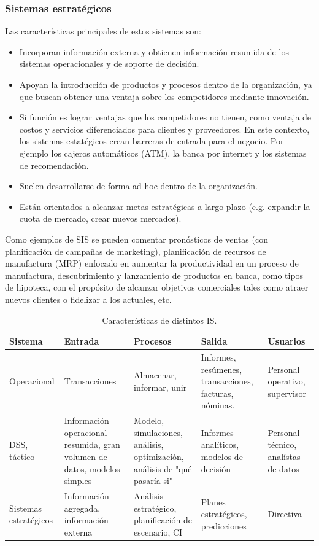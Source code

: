 \subsubsection{Sistemas estratégicos}

Las características principales de estos sistemas son:
\begin{itemize}
\item Incorporan información externa y obtienen información resumida de los sistemas operacionales y de soporte de decisión.
\item Apoyan la introducción de productos y procesos dentro de la organización, ya que buscan obtener una ventaja sobre los competidores mediante innovación.
\item Si función es lograr ventajas que los competidores no tienen, como ventaja de costos y servicios diferenciados para clientes y proveedores. En este contexto, los sistemas estatégicos crean barreras de entrada para el negocio. Por ejemplo los cajeros automáticos (ATM), la banca por internet y los sistemas de recomendación.
\item Suelen desarrollarse de forma ad hoc dentro de la organización.
\item Están orientados a alcanzar metas estratégicas a largo plazo (e.g. expandir la cuota de mercado, crear nuevos mercados).
\end{itemize}

Como ejemplos de SIS se pueden comentar pronósticos de ventas (con planificación de campañas de marketing), planificación de recursos de manufactura (MRP) enfocado en aumentar la productividad en un proceso de manufactura, descubrimiento y lanzamiento de productos en banca, como tipos de hipoteca, con el propósito de alcanzar objetivos comerciales tales como atraer nuevos clientes o fidelizar a los actuales, etc.

\begin{table}[ht]
\centering
\begin{tabular}{p{2.75cm}p{2.5cm}p{3cm}p{2.5cm}p{2.5cm}}
\hline
\rowcolor{gray!50}
\textbf{Sistema} & \textbf{Entrada} & \textbf{Procesos} & \textbf{Salida} & \textbf{Usuarios} \\ \hline
\footnotesize Operacional & \footnotesize Transacciones & \footnotesize Almacenar, informar, unir & \footnotesize Informes, resúmenes, transacciones, facturas, nóminas. & \footnotesize Personal operativo, supervisor \\ \hline
\footnotesize DSS, táctico & \footnotesize Información operacional resumida, gran volumen de datos, modelos simples & \footnotesize Modelo, simulaciones, análisis, optimización, análisis de "qué pasaría si"  & \footnotesize Informes analíticos, modelos de decisión & \footnotesize Personal técnico, analístas de datos \\ \hline
\footnotesize Sistemas estratégicos & \footnotesize Información agregada, información externa & \footnotesize Análisis estratégico, planificación de escenario, CI & \footnotesize Planes estratégicos, predicciones & \footnotesize Directiva \\ \hline
\end{tabular}
\caption{Características de distintos IS.}
\end{table}


